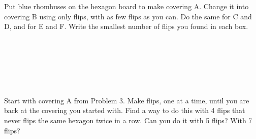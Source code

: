 \documentclass[12pt]{extarticle}
\begin{document}
\vspace{4.3in}

\newpage
\prob Put blue rhombuses on the hexagon board to make covering A. Change it into covering B using only flips, with as few flips as you can. Do the same for C and D, and for E and F. Write the smallest number of flips you found in each box.

\vspace{16pt}
\begin{minipage}[t]{4.05in}
\vspace{0pt}
\end{minipage}%
\begin{minipage}[t]{3.45in}
\vspace{0pt}
\centering
{}\hspace{0.07in}\raisebox{0.75in}{\onearrow}\hspace{0.07in}\\[8pt]
\abox\\[22pt]
\hspace{0.07in}\raisebox{0.75in}{\onearrow}\hspace{0.07in}\\[8pt]
\abox\\[22pt]
\hspace{0.07in}\raisebox{0.75in}{\onearrow}\hspace{0.07in}\\[8pt]
\abox
\end{minipage}

\newpage
\prob Start with covering A from Problem 3. Make flips, one at a time, until you are back at the covering you started with. Find a way to do this with 4 flips that never flips the same hexagon twice in a row. Can you do it with 5 flips? With 7 flips?

\vspace{10pt}
\begin{center}
\hspace{0.25in}\hspace{0.25in}\hspace{0.25in}\hspace{0.25in}
\end{center}

\vspace{2pt}
\end{document}
